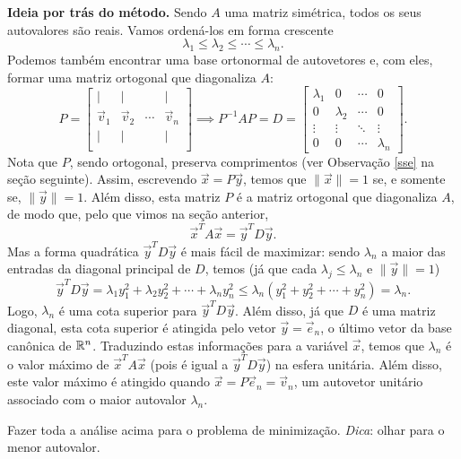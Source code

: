 \documentclass[../livro.tex]{subfiles}
\begin{document}
\noindent \textbf{Ideia por trás do método.} Sendo $A$ uma matriz simétrica, todos os seus autovalores são reais. Vamos ordená-los em forma crescente
\[
\lambda_1 \le \lambda_2 \le \cdots \le \lambda_n.
\] Podemos também encontrar uma base ortonormal de autovetores e, com eles, formar uma matriz ortogonal que diagonaliza $A$:
\[
P =  
\begin{bmatrix}
| & | &  & | \\
\vec{v}_1 & \vec{v}_2 & \cdots & \vec{v}_n \\
| & | &  & | \\
\end{bmatrix} \implies
P^{-1} A P = D = 
\begin{bmatrix}
\lambda_1 & 0  & \cdots & 0 \\
0 & \lambda_2  & \cdots & 0 \\
\vdots & \vdots & \ddots & \vdots \\
0 & 0 & \cdots & \lambda_n
\end{bmatrix}.
\] Nota que $P$, sendo ortogonal, preserva comprimentos (ver Observação \ref{sse} na seção seguinte). Assim, escrevendo $\vec{x} = P \vec{y}$, temos que $\|\vec{x}\| = 1$ se, e somente se, $\|\vec{y}\| = 1$. Além disso, esta matriz $P$ é a matriz ortogonal que diagonaliza $A$, de modo que, pelo que vimos na seção anterior,
\[
\vec{x}^T A \vec{x} = \vec{y}^T D \vec{y}.
\] Mas a forma quadrática $\vec{y}^T D \vec{y}$ é mais fácil de maximizar: sendo $\lambda_n$ a maior das entradas da diagonal principal de $D$, temos (já que cada $\lambda_j \le \lambda_n$ e $\|\vec{y}\| = 1$)
\[
\vec{y}^T D \vec{y} = \lambda_1 y_1^2 + \lambda_2 y_2^2 + \cdots + \lambda_n y_n^2 \le  \lambda_n (y_1^2 +y_2^2 + \cdots + y_n^2) = \lambda_n.
\] Logo, $\lambda_n$ é uma cota superior para $\vec{y}^T D \vec{y}$. Além disso, já que $D$ é uma matriz diagonal, esta cota superior é atingida pelo vetor $\vec{y} = \vec{e}_n$, o último vetor da base canônica de $\mathbb{R}^n$. Traduzindo estas informações para a variável $\vec{x}$, temos que $\lambda_n$ é o valor máximo de $\vec{x}^T A \vec{x}$ (pois é igual a $\vec{y}^T D \vec{y}$) na esfera unitária. Além disso, este valor máximo é atingido quando $\vec{x} = P \vec{e}_n = \vec{v}_n$, um autovetor unitário associado com o maior autovalor $\lambda_n$.

\begin{exercise}
	Fazer toda a análise acima para o problema de minimização. \textit{Dica}: olhar para o menor autovalor.
\end{exercise}
\end{document}
